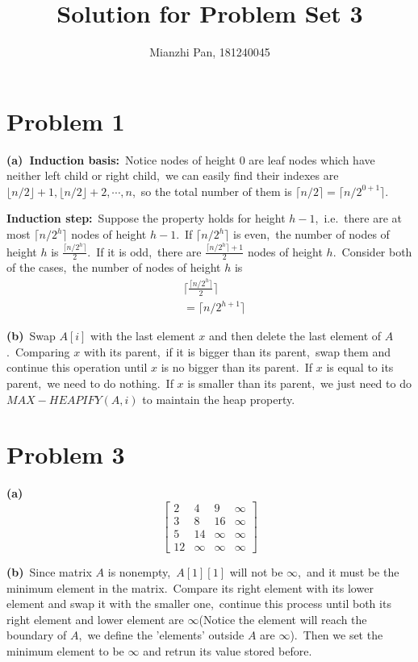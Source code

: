 \documentclass[]{article}
\title{Solution for Problem Set 3}
\author{Mianzhi Pan, 181240045}
\begin{document}
	\maketitle
	\section{Problem 1}
	\textbf{(a)\ Induction basis:}\ Notice nodes of height $0$ are leaf nodes which have neither left child or right child,\ we can easily find their indexes are $\lfloor n/2\rfloor + 1, \lfloor n/2\rfloor + 2, \cdots, n$,\ so the total number of them is $\lceil n/2\rceil = \lceil n/2^{0+1}\rceil$.
	
	\textbf{Induction step:}\ Suppose the property holds for height $h-1$,\ i.e.\ there are at most $\lceil n/2^h\rceil$ nodes of height $h-1$.\ If $\lceil n/2^h\rceil$ is even,\ the number of nodes of height $h$ is $\frac{\lceil n/2^h\rceil}{2}$.\ If it is odd,\ there are $\frac{\lceil n/2^h\rceil + 1}{2}$ nodes of height $h$.\ Consider both of the cases,\ the number of nodes of height $h$ is
	\begin{equation*}
	\begin{aligned}
	&\lceil \frac{\lceil n/2^h\rceil}{2}\rceil\\
	&=\lceil n/2^{h+1}\rceil
	\end{aligned}
	\end{equation*}
	
	\textbf{(b)}\ Swap $A[i]$ with the last element $x$ and then delete the last element of $A$.\ Comparing $x$ with its parent,\ if it is bigger than its parent,\ swap them and continue this operation until $x$ is no bigger than its parent.\ If $x$ is equal to its parent,\ we need to do nothing.\ If $x$ is smaller than its parent,\ we just need to do $MAX-HEAPIFY(A, i)$ to maintain the heap property.
	
	\section{Problem 3}
	\textbf{(a)}$$ \begin{bmatrix} 2&4&9&\infty\\3&8&16&\infty\\5&14&\infty&\infty\\12&\infty&\infty&\infty \end{bmatrix}$$
	
	\textbf{(b)}\ Since matrix $A$ is nonempty,\ $A[1][1]$ will not be $\infty$,\ and it must be the minimum element in the matrix.\ Compare its right element with its lower element and swap it with the smaller one,\ continue this process until both its right element and lower element are $\infty$(Notice the element will reach the boundary of $A$,\ we define the 'elements' outside $A$ are $\infty$).\ Then we set the minimum element to be $\infty$ and retrun its value stored before.
	
\end{document}
